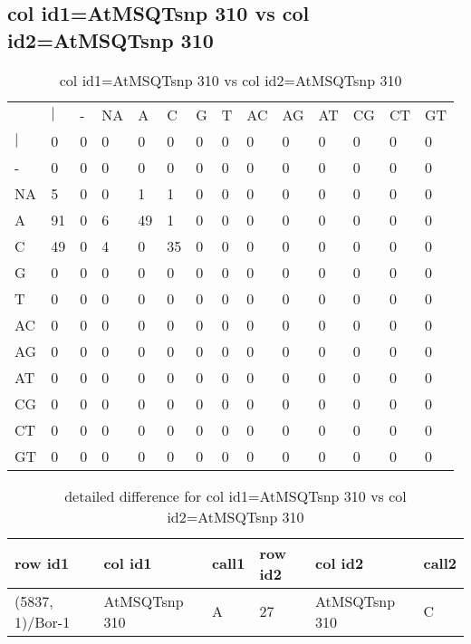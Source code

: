 \subsection{col id1=AtMSQTsnp 310 vs col id2=AtMSQTsnp 310}
\begin{center}
\begin{longtable}{|l|l|l|l|l|l|l|l|l|l|l|l|l|l|}
\caption{col id1=AtMSQTsnp 310 vs col id2=AtMSQTsnp 310} \label{table_dm648}\\
\hline
\\
\hline
&$|$&-&NA&A&C&G&T&AC&AG&AT&CG&CT&GT\\
$|$&0&0&0&0&0&0&0&0&0&0&0&0&0\\
-&0&0&0&0&0&0&0&0&0&0&0&0&0\\
NA&5&0&0&1&1&0&0&0&0&0&0&0&0\\
A&91&0&6&49&1&0&0&0&0&0&0&0&0\\
C&49&0&4&0&35&0&0&0&0&0&0&0&0\\
G&0&0&0&0&0&0&0&0&0&0&0&0&0\\
T&0&0&0&0&0&0&0&0&0&0&0&0&0\\
AC&0&0&0&0&0&0&0&0&0&0&0&0&0\\
AG&0&0&0&0&0&0&0&0&0&0&0&0&0\\
AT&0&0&0&0&0&0&0&0&0&0&0&0&0\\
CG&0&0&0&0&0&0&0&0&0&0&0&0&0\\
CT&0&0&0&0&0&0&0&0&0&0&0&0&0\\
GT&0&0&0&0&0&0&0&0&0&0&0&0&0\\
\hline
\end{longtable}
\end{center}

\begin{center}
\begin{longtable}{|l|l|l|l|l|l|}
\caption{detailed difference for col id1=AtMSQTsnp 310 vs col id2=AtMSQTsnp 310} \label{table_dm649}\\
\hline
row id1&col id1&call1&row id2&col id2&call2\\
\hline
(5837, 1)/Bor-1&AtMSQTsnp 310&A&27&AtMSQTsnp 310&C\\
\hline
\end{longtable}
\end{center}

